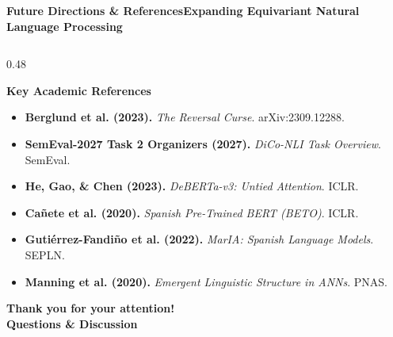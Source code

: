 \documentclass[aspectratio=169,10pt]{beamer}
\begin{document}
\begin{frame}{\textbf{Future Directions \& References}}{\textbf{Expanding Equivariant Natural Language Processing}}
\begin{columns}[T]
    \begin{column}{0.48\textwidth}
      \begin{block}{\textbf{Key Academic References}}
        \tiny
        \begin{itemize}\setlength{\itemsep}{0pt}\setlength{\parskip}{0pt}
          \item \textbf{Berglund et al. (2023).} \textit{The Reversal Curse}. arXiv:2309.12288.
          \item \textbf{SemEval-2027 Task 2 Organizers (2027).} \textit{DiCo-NLI Task Overview}. SemEval.
          \item \textbf{He, Gao, \& Chen (2023).} \textit{DeBERTa-v3: Untied Attention}. ICLR.
          \item \textbf{Cañete et al. (2020).} \textit{Spanish Pre-Trained BERT (BETO)}. ICLR.
          \item \textbf{Gutiérrez-Fandiño et al. (2022).} \textit{MarIA: Spanish Language Models}. SEPLN.
          \item \textbf{Manning et al. (2020).} \textit{Emergent Linguistic Structure in ANNs}. PNAS.
        \end{itemize}
      \end{block}
      \vspace{0.1cm}
      \centering
      {\large\textbf{\color{UNAMNavy}Thank you for your attention!}} \\
      \vspace{0.05cm}
      {\scriptsize\textbf{\color{UNAMGold!90!black}Questions \& Discussion}}
    \end{column}
  \end{columns}
\end{frame}
\end{document}
